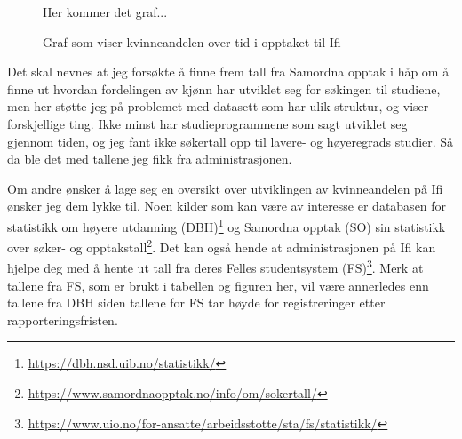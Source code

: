 \begin{figure}
	Her kommer det graf...
	\caption{Graf som viser kvinneandelen over tid i opptaket til Ifi}
	\label{figure:kvinneandel}
\end{figure}

Det skal nevnes at jeg forsøkte å finne frem tall fra Samordna opptak i håp om å finne ut hvordan fordelingen av kjønn har utviklet seg for søkingen til studiene, men her støtte jeg på problemet med datasett som har ulik struktur, og viser forskjellige ting. Ikke minst har studieprogrammene som sagt utviklet seg gjennom tiden, og jeg fant ikke søkertall opp til lavere- og høyeregrads studier. Så da ble det med tallene jeg fikk fra administrasjonen.

Om andre ønsker å lage seg en oversikt over utviklingen av kvinneandelen på Ifi ønsker jeg dem lykke til. Noen kilder som kan være av interesse er databasen for statistikk om høyere utdanning (DBH)\footnote{\url{https://dbh.nsd.uib.no/statistikk/}} og Samordna opptak (SO) sin statistikk over søker- og opptakstall\footnote{\url{https://www.samordnaopptak.no/info/om/sokertall/}}. Det kan også hende at administrasjonen på Ifi kan hjelpe deg med å hente ut tall fra deres Felles studentsystem (FS)\footnote{\url{https://www.uio.no/for-ansatte/arbeidsstotte/sta/fs/statistikk/}}. Merk at tallene fra FS, som er brukt i tabellen og figuren her, vil være annerledes enn tallene fra DBH siden tallene for FS tar høyde for registreringer etter rapporteringsfristen.